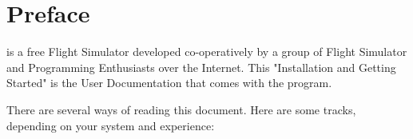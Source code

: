 
\chapter{Preface\label{preface}}

\FlightGear{} is a free Flight Simulator developed co-operatively by a group of Flight
Simulator and Programming Enthusiasts over the Internet. This "Installation and Getting
Started" is the User Documentation that comes with the program.

There are several ways of reading this document. Here are some tracks, depending on your
system and experience:







